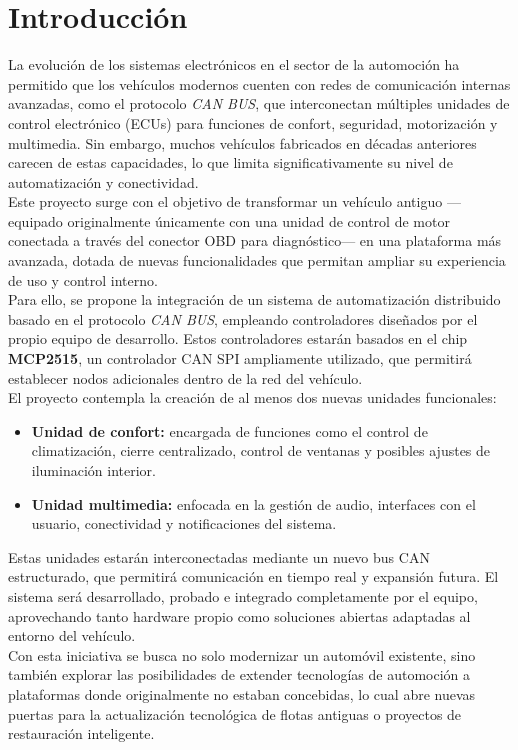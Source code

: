 \section{Introducción}

La evolución de los sistemas electrónicos en el sector de la automoción ha permitido que los vehículos modernos cuenten con redes de comunicación internas avanzadas, como el protocolo \textit{CAN BUS}, que interconectan múltiples unidades de control electrónico (ECUs) para funciones de confort, seguridad, motorización y multimedia. Sin embargo, muchos vehículos fabricados en décadas anteriores carecen de estas capacidades, lo que limita significativamente su nivel de automatización y conectividad.\\

Este proyecto surge con el objetivo de transformar un vehículo antiguo —equipado originalmente únicamente con una unidad de control de motor conectada a través del conector OBD para diagnóstico— en una plataforma más avanzada, dotada de nuevas funcionalidades que permitan ampliar su experiencia de uso y control interno.\\

Para ello, se propone la integración de un sistema de automatización distribuido basado en el protocolo \textit{CAN BUS}, empleando controladores diseñados por el propio equipo de desarrollo. Estos controladores estarán basados en el chip \textbf{MCP2515}, un controlador CAN SPI ampliamente utilizado, que permitirá establecer nodos adicionales dentro de la red del vehículo.\\

El proyecto contempla la creación de al menos dos nuevas unidades funcionales:

\begin{itemize}
  \item \textbf{Unidad de confort:} encargada de funciones como el control de climatización, cierre centralizado, control de ventanas y posibles ajustes de iluminación interior.
  \item \textbf{Unidad multimedia:} enfocada en la gestión de audio, interfaces con el usuario, conectividad y notificaciones del sistema.
\end{itemize}

Estas unidades estarán interconectadas mediante un nuevo bus CAN estructurado, que permitirá comunicación en tiempo real y expansión futura. El sistema será desarrollado, probado e integrado completamente por el equipo, aprovechando tanto hardware propio como soluciones abiertas adaptadas al entorno del vehículo.\\

Con esta iniciativa se busca no solo modernizar un automóvil existente, sino también explorar las posibilidades de extender tecnologías de automoción a plataformas donde originalmente no estaban concebidas, lo cual abre nuevas puertas para la actualización tecnológica de flotas antiguas o proyectos de restauración inteligente.

